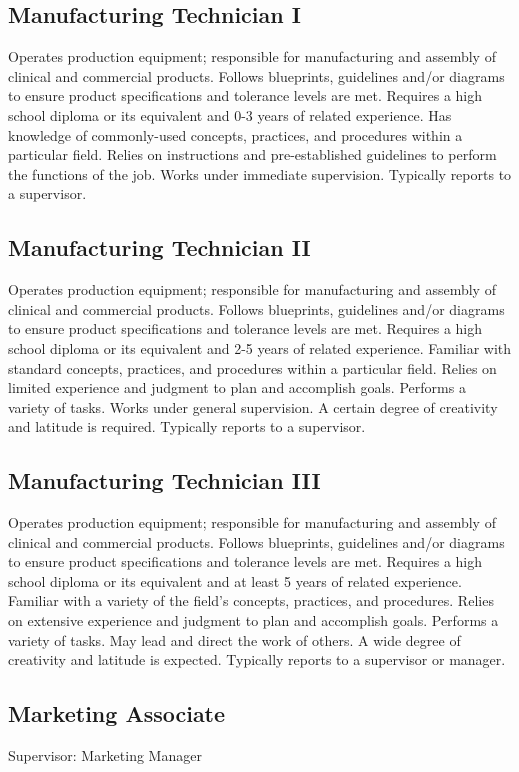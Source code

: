 \subsection{Manufacturing Technician I}
Operates production equipment; responsible for manufacturing and assembly of clinical and commercial products. Follows blueprints, guidelines and/or diagrams to ensure product specifications and tolerance levels are met. Requires a high school diploma or its equivalent and 0-3 years of related experience. Has knowledge of commonly-used concepts, practices, and procedures within a
particular field. Relies on instructions and pre-established guidelines to perform the functions of the job. Works under immediate supervision. Typically reports to a supervisor.

\subsection{Manufacturing Technician II}
Operates production equipment; responsible for manufacturing and assembly of clinical and commercial products. Follows blueprints, guidelines and/or diagrams to ensure product specifications and tolerance levels are met. Requires a high school diploma or its equivalent and 2-5 years of related experience. Familiar with standard concepts, practices, and procedures within a particular field. Relies on limited experience and judgment to plan and accomplish goals. Performs a variety of tasks. Works under general supervision. A certain degree of creativity and latitude is required. Typically reports to a supervisor.

\subsection{Manufacturing Technician III}
Operates production equipment; responsible for manufacturing and assembly of clinical and commercial products. Follows blueprints, guidelines and/or diagrams to ensure product specifications and tolerance levels are met. Requires a high school diploma or its equivalent and at least 5 years of related experience. Familiar with a variety of the field's concepts, practices, and procedures. Relies on
extensive experience and judgment to plan and accomplish goals. Performs a variety of tasks. May lead and direct the work of others. A wide degree of creativity and latitude is expected. Typically reports to a supervisor or manager.

\subsection{Marketing Associate}
Supervisor: Marketing Manager

